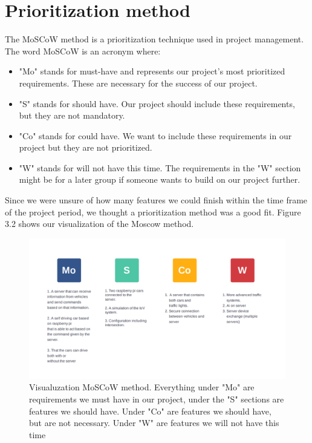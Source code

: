 \section{Prioritization method}
The MoSCoW method is a prioritization technique used in project management. The word MoSCoW is an acronym where:

\begin{itemize}
	\item "Mo" stands for must-have and represents our project's most prioritized requirements. These are necessary for the success of our project.
	\item "S" stands for should have. Our project should include these requirements, but they are not mandatory.
	\item "Co" stands for could have. We want to include these requirements in our project but they are not prioritized.
	\item "W" stands for will not have this time. The requirements in the "W" section might be for a later group if someone wants to build on our project further.
\end{itemize}

Since we were unsure of how many features we could finish within the time frame of the project period, we thought a prioritization method was a good fit. Figure 3.2 shows our visualization of the Moscow method.

\begin{figure}[h!]
	\centering
	\includegraphics[width=1\linewidth]{figures/MosCoW_method}
	\caption[MosCoW method]{Visualuzation MoSCoW method. Everything under "Mo" are requirements we must have in our project, under the "S" sections are features we should have. Under "Co" are features we should have, but are not necessary. Under "W" are features we will not have this time}
	\label{fig:moscowmethod}
\end{figure}


